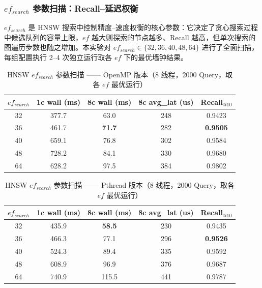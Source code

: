 \documentclass[UTF8,a4paper,10pt]{ctexart}
\begin{document}
\subsubsection{$ef_{search}$ 参数扫描：Recall--延迟权衡}

$ef_{search}$ 是 HNSW 搜索中控制精度--速度权衡的核心参数：它决定了贪心搜索过程中候选队列的容量上限，$ef$ 越大则探索的节点越多、Recall 越高，但单次搜索的图遍历步数也随之增加。本实验对 $ef_{search} \in \{32, 36, 40, 48, 64\}$ 进行了全面扫描，每组配置执行 2--4 次独立运行取各 $ef$ 下的最优墙钟结果。

\begin{table}[H]
\centering
\caption{HNSW $ef_{search}$ 参数扫描 —— OpenMP 版本（8 线程，2000 Query，取各 $ef$ 最优运行）}
\begin{tabular}{ccccc}
\hline
$ef_{search}$ & 1c wall (ms) & 8c wall (ms) & 8c avg\_lat (us) & Recall$_{@10}$ \\
\hline
32 & 377.7 & 63.0  & 248  & 0.9423 \\
36 & 461.7 & \textbf{71.7}  & 282  & \textbf{0.9505} \\
40 & 659.1 & 76.8  & 302  & 0.9584 \\
48 & 728.2 & 84.1  & 330  & 0.9680 \\
64 & 628.2 & 97.5  & 384  & 0.9802 \\
\hline
\end{tabular}
\end{table}

\begin{table}[H]
\centering
\caption{HNSW $ef_{search}$ 参数扫描 —— Pthread 版本（8 线程，2000 Query，取各 $ef$ 最优运行）}
\begin{tabular}{ccccc}
\hline
$ef_{search}$ & 1c wall (ms) & 8c wall (ms) & 8c avg\_lat (us) & Recall$_{@10}$ \\
\hline
32 & 435.9 & \textbf{58.5}  & 230  & 0.9435 \\
36 & 466.3 & 77.1  & 296  & \textbf{0.9526} \\
40 & 524.3 & 89.4  & 335  & 0.9592 \\
48 & 608.9 & 96.9  & 376  & 0.9687 \\
64 & 740.9 & 115.5 & 441  & 0.9787 \\
\hline
\end{tabular}
\end{table}
\end{document}
